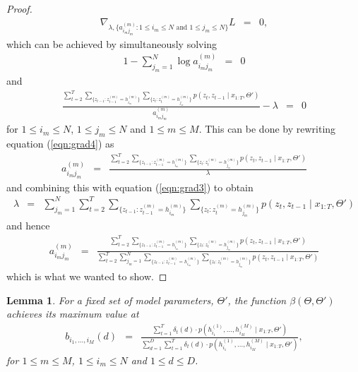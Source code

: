 \documentclass{amsart}
\newtheorem{lemma}[theorem]{Lemma}
\begin{document}
\begin{proof}
\begin{eqnarray*}
\nabla_{\lambda,\{a_{i_mj_m}^{(m)}:1\leq i_m\leq N\text{ and }1\leq j_m\leq N\}}L&=&0,
\end{eqnarray*}
which can be achieved by simultaneously solving
\begin{eqnarray}\label{eqn:grad3}
1-\sum_{j_m=1}^N\log a_{i_mj_m}^{(m)}&=&0
\end{eqnarray}
and 
\begin{eqnarray}\label{eqn:grad4}
\frac{\sum_{t=2}^T\sum_{\{z_{t-1}:z_{t-1}^{(m)}=h_{i_m}^{(m)}\}}\sum_{\{z_t:z_t^{(m)}=h_{j_m}^{(m)}\}}p(z_{t},z_{t-1}\mid x_{1:T},\Theta')}{a_{i_mj_m}^{(m)}}-\lambda &=&0
\end{eqnarray}
for $1\leq i_m\leq N$, $1\leq j_m\leq N$ and $1\leq m\leq M$. This can be done by rewriting equation (\ref{eqn:grad4}) as 
\begin{eqnarray*}
a_{i_mj_m}^{(m)} &=& \frac{\sum_{t=2}^T\sum_{\{z_{t-1}:z_{t-1}^{(m)}=h_{i_m}^{(m)}\}}\sum_{\{z_t:z_t^{(m)}=h_{j_m}^{(m)}\}}p(z_{t},z_{t-1}\mid x_{1:T},\Theta')}{\lambda}
\end{eqnarray*}
and combining this with equation (\ref{eqn:grad3}) to obtain
\begin{eqnarray*}
\lambda & = & \sum_{j_m=1}^N\sum_{t=2}^T\sum_{\{z_{t-1}:z_{t-1}^{(m)}=h_{i_m}^{(m)}\}}\sum_{\{z_t:z_t^{(m)}=h_{j_m}^{(m)}\}}p(z_{t},z_{t-1}\mid x_{1:T},\Theta')
\end{eqnarray*}
and hence 
\begin{eqnarray*}
a_{i_mj_m}^{(m)} &=& \frac{\sum_{t=2}^T\sum_{\{z_{t-1}:z_{t-1}^{(m)}=h_{i_m}^{(m)}\}}\sum_{\{z_t:z_t^{(m)}=h_{j_m}^{(m)}\}}p(z_{t},z_{t-1}\mid x_{1:T},\Theta')}{\sum_{t=2}^T\sum_{j_m=1}^N\sum_{\{z_{t-1}:z_{t-1}^{(m)}=h_{i_m}^{(m)}\}}\sum_{\{z_t:z_t^{(m)}=h_{j_m}^{(m)}\}}p(z_{t},z_{t-1}\mid x_{1:T},\Theta')}
\end{eqnarray*}
which is what we wanted to show.
\end{proof}

\begin{lemma}
For a fixed set of model parameters, $\Theta'$, the function $\beta(\Theta,\Theta')$ achieves its maximum value at
\begin{eqnarray*}
b_{i_1,...,i_M}(d) &=& \frac{\sum_{t=1}^T\delta_t(d)\cdot p(h_{i_1}^{(1)},...,h_{i_M}^{(M)}\mid x_{1:T},\Theta')}{\sum_{d=1}^D\sum_{t=1}^T\delta_t(d)\cdot p(h_{i_1}^{(1)},...,h_{i_M}^{(M)}\mid x_{1:T},\Theta')},
\end{eqnarray*}
for $1\leq m\leq M$, $1\leq i_m\leq N$ and $1\leq d\leq D$.
\end{lemma}
\end{document}
